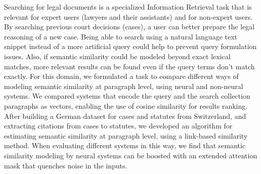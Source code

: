 Searching for legal documents is a specialized Information Retrieval task that is relevant for expert users (lawyers and their assistants) and for non-expert users. By searching previous court decisions (cases), a user can better prepare the legal reasoning of a new case. Being able to search using a natural language text snippet instead of a more artificial query could help to prevent query formulation issues. Also, if semantic similarity could be modeled beyond exact lexical matches, more relevant results can be found even if the query terms don't match exactly. For this domain, we formulated a task to compare different ways of modeling semantic similarity at paragraph level, using neural and non-neural systems. We compared systems that encode the query and the search collection paragraphs as vectors, enabling the use of cosine similarity for results ranking. After building a German dataset for cases and statutes from Switzerland, and extracting citations from cases to statutes, we developed an algorithm for estimating semantic similarity at paragraph level, using a link-based similarity method. When evaluating different systems in this way, we find that semantic similarity modeling by neural systems can be boosted with an extended attention mask that quenches noise in the inputs.

